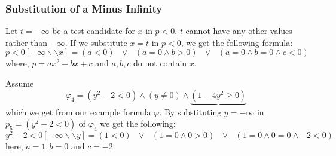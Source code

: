 \subsubsection{Substitution of a Minus Infinity}
	Let $t = -\infty$ be a test candidate for $x$ in $p<0$. $t$ cannot have any other values rather than $-\infty$. If we substitute $x = t$ in $p<0$, we get the following formula:
	$$p<0[-\infty\backslash\backslash x] = (a<0) \text{ } \vee \text{ } (a=0 \wedge b>0) \text{ } \vee \text{ } (a=0 \wedge b=0 \wedge c<0) $$
	where, $p=ax^{2}+bx+c$ and $a, b, c$ do not contain $x$.
	\begin{example}
		Assume $$\varphi_{4} = (y^{2} - 2 < 0)\wedge (y \neq 0) \wedge \underbrace{(1-4y^{2}\geq 0)} $$ which we get from our example formula $\varphi$. By substituting $y=-\infty$ in $p_{5}=(y^{2} - 2 < 0)$ of $\varphi_{4}$ we get the following:
			$$ y^{2} - 2 < 0 [-\infty\backslash\backslash y] = (1<0)\text{ } \vee\text{ } (1=0 \wedge 0 > 0) \text{ } \vee \text{ } (1=0 \wedge 0=0 \wedge -2<0) $$
			here, $a=1, b=0$ and $c=-2$.
			\begin{center}
				
			\end{center}
	\end{example}